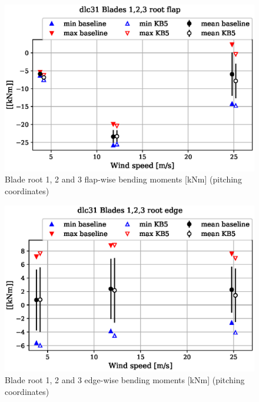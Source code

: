 \begin{figure}[!ht]
\begin{center}
	\includegraphics[width=.85\linewidth]{figures/baseline-vs-KB6/dlc31/blade1-blade1-node-001-momentvec-x_AA0007_AA0003.eps}
\end{center}
\caption{Blade root 1, 2 and 3 flap-wise bending moments [kNm] (pitching coordinates)}
\label{fig:baseline-vs-KB6:dlc31:blade-root-flap}
\end{figure}

\begin{figure}[!ht]
\begin{center}
	\includegraphics[width=.85\linewidth]{figures/baseline-vs-KB6/dlc31/blade1-blade1-node-001-momentvec-y_AA0007_AA0003.eps}
\end{center}
\caption{Blade root 1, 2 and 3 edge-wise bending moments [kNm] (pitching coordinates)}
\label{fig:baseline-vs-KB6:dlc31:blade-root-edge}
\end{figure}


